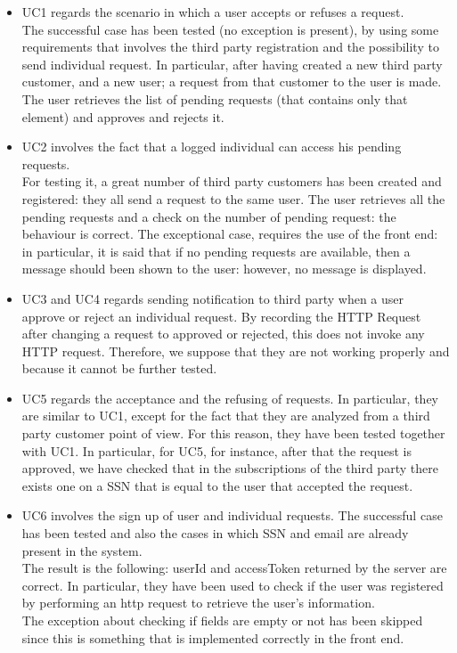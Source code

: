 \begin{itemize}
\item 
UC1 regards the scenario in which a user accepts or refuses a request. \\
The successful case has been tested (no exception is present), by using some requirements that involves the
third party registration and the possibility to send individual request. In particular, after having created a new third party customer,
and a new user; a request from that customer to the user is made. The user retrieves the list of pending requests (that contains only that
element) and approves and rejects it.

\item 
UC2 involves the fact that a logged individual can access his pending requests. \\
For testing it, a great number of third party customers has been created and registered: they all send a request to the same user.
The user retrieves all the pending requests and a check on the number of pending request: the behaviour is correct.
The exceptional case, requires the use of the front end: in particular, it is said that if no pending requests are available, then a message
should been shown to the user: however, no message is displayed.

\item 
UC3 and UC4 regards sending notification to third party when a user approve or reject an individual request. By recording the HTTP Request after changing a request to approved or rejected, this does not invoke any HTTP request. Therefore, we suppose that they are not working properly and because it cannot be further tested.

\item 
UC5 regards the acceptance and the refusing of requests. In particular, they are similar to UC1, except for the fact
that they are analyzed from a third party customer point of view. For this reason, they have been tested together with UC1. 
In particular, for UC5, for instance, after that the request is approved, we have checked that in the subscriptions
of the third party there exists one on a SSN that is equal to the user that accepted the request.

\item UC6 involves the sign up of user and individual requests. The successful case has been tested and also the cases in which SSN and email
are already present in the system. \\
The result is the following: userId and accessToken returned by the server are correct. In particular, they have been used to check
if the user was registered by performing an http request to retrieve the user's information.  \\
The exception about checking if fields are empty or not has been skipped since this is something that is implemented correctly in the front
end.


\end{itemize}
